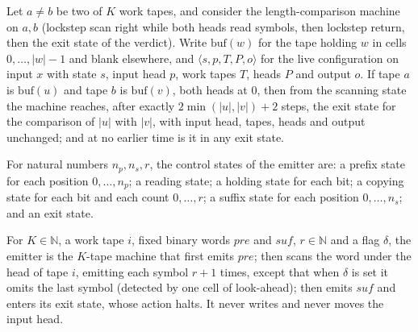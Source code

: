 \begin{theorem}
\label{Turing.NTimeDiag.qy_cmp_run}
\leanok
{}
Let $a \ne b$ be two of $K$ work tapes, and consider the length-comparison machine on $a, b$
(lockstep scan right while both heads read symbols, then lockstep return, then the exit state of
the verdict). Write $\mathrm{buf}(w)$ for the tape holding $w$ in cells $0, \dots, |w| - 1$ and
blank elsewhere, and $\langle s, p, T, P, o\rangle$ for the live configuration on input $x$ with
state $s$, input head $p$, work tapes $T$, heads $P$ and output $o$. If tape $a$ is
$\mathrm{buf}(u)$ and tape $b$ is $\mathrm{buf}(v)$, both heads at $0$, then from the scanning
state the machine reaches, after exactly $2\min(|u|, |v|) + 2$ steps, the exit state for the
comparison of $|u|$ with $|v|$, with input head, tapes, heads and output unchanged; and at no
earlier time is it in any exit state.
\end{theorem}

\begin{definition}
\label{Turing.NTimeDiag.QyEm}
\leanok
For natural numbers $n_p, n_s, r$, the control states of the emitter are: a prefix state for each
position $0, \dots, n_p$; a reading state; a holding state for each bit; a copying state for each
bit and each count $0, \dots, r$; a suffix state for each position $0, \dots, n_s$; and an exit
state.
\end{definition}

\begin{definition}
\label{Turing.NTimeDiag.qyEmitTM}
\leanok
{}
For $K \in \mathbb{N}$, a work tape $i$, fixed binary words $\mathit{pre}$ and $\mathit{suf}$,
$r \in \mathbb{N}$ and a flag $\delta$, the emitter is the $K$-tape machine that first emits
$\mathit{pre}$; then scans the word under the head of tape $i$, emitting each symbol $r + 1$
times, except that when $\delta$ is set it omits the last symbol (detected by one cell of
look-ahead); then emits $\mathit{suf}$ and enters its exit state, whose action halts. It never
writes and never moves the input head.
\end{definition}

